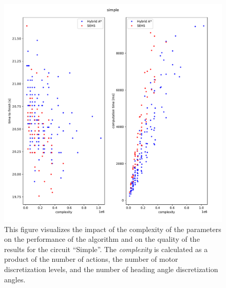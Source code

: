 \begin{figure}[!tbp]%
	\centering
	\includegraphics[width=\textwidth]{../img/experiments/complexity_simple}
	\caption{This figure visualizes the impact of the complexity of the parameters on the performance of the algorithm and on the quality of the results for the circuit ``Simple''. The \textit{complexity} is calculated as a product of the number of actions, the number of motor discretization levels, and the number of heading angle discretization angles.}
	\label{fig:complexity-to-time}
\end{figure}

